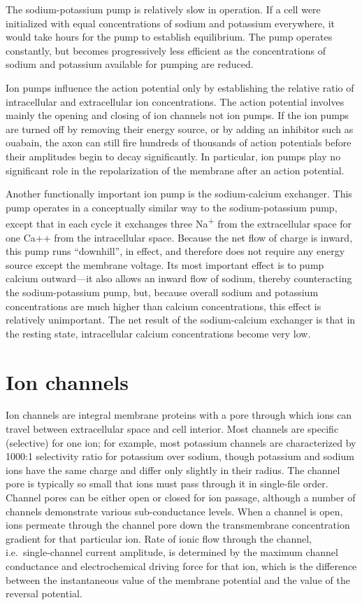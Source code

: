 \documentclass[]{book}
\begin{document}
The sodium-potassium pump is relatively slow in operation. If a cell were initialized with equal concentrations of sodium and potassium everywhere, it would take hours for the pump to establish equilibrium. The pump operates constantly, but becomes progressively less efficient as the concentrations of sodium and potassium available for pumping are reduced.

Ion pumps influence the action potential only by establishing the relative ratio of intracellular and extracellular ion concentrations. The action potential involves mainly the opening and closing of ion channels not ion pumps. If the ion pumps are turned off by removing their energy source, or by adding an inhibitor such as ouabain, the axon can still fire hundreds of thousands of action potentials before their amplitudes begin to decay significantly. In particular, ion pumps play no significant role in the repolarization of the membrane after an action potential.

Another functionally important ion pump is the sodium-calcium exchanger. This pump operates in a conceptually similar way to the sodium-potassium pump, except that in each cycle it exchanges three Na\textsuperscript{+} from the extracellular space for one Ca++ from the intracellular space. Because the net flow of charge is inward, this pump runs ``downhill'', in effect, and therefore does not require any energy source except the membrane voltage. Its most important effect is to pump calcium outward---it also allows an inward flow of sodium, thereby counteracting the sodium-potassium pump, but, because overall sodium and potassium concentrations are much higher than calcium concentrations, this effect is relatively unimportant. The net result of the sodium-calcium exchanger is that in the resting state, intracellular calcium concentrations become very low.

\hypertarget{ion-channels}{%
\section{Ion channels}\label{ion-channels}}

Ion channels are integral membrane proteins with a pore through which ions can travel between extracellular space and cell interior. Most channels are specific (selective) for one ion; for example, most potassium channels are characterized by 1000:1 selectivity ratio for potassium over sodium, though potassium and sodium ions have the same charge and differ only slightly in their radius. The channel pore is typically so small that ions must pass through it in single-file order. Channel pores can be either open or closed for ion passage, although a number of channels demonstrate various sub-conductance levels. When a channel is open, ions permeate through the channel pore down the transmembrane concentration gradient for that particular ion. Rate of ionic flow through the channel, i.e.~single-channel current amplitude, is determined by the maximum channel conductance and electrochemical driving force for that ion, which is the difference between the instantaneous value of the membrane potential and the value of the reversal potential.
\end{document}
